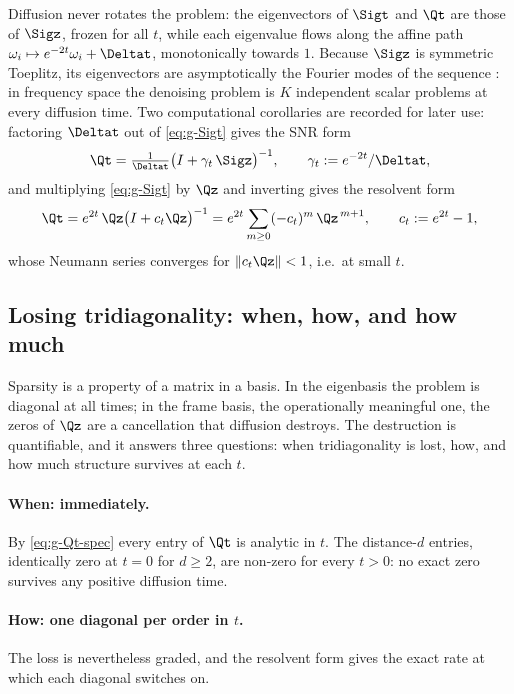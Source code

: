 Diffusion never rotates the problem: the eigenvectors of $\Sigt$ and
$\Qt$ are those of $\Sigz$, frozen for all $t$, while each eigenvalue
flows along the affine path $\omega_i \mapsto e^{-2t}\omega_i + \Deltat$,
monotonically towards $1$. Because $\Sigz$ is symmetric Toeplitz, its
eigenvectors are asymptotically the Fourier modes of the sequence
\citep{brockwell1991time}: in frequency space the denoising problem is $K$
independent scalar problems at every diffusion time. Two computational
corollaries are recorded for later use: factoring $\Deltat$ out of
\eqref{eq:g-Sigt} gives the SNR form
\begin{equation}
  \Qt = \tfrac{1}{\Deltat} \big( I + \gamma_t\, \Sigz \big)^{-1},
  \qquad \gamma_t := e^{-2t}/\Deltat ,
  \label{eq:g-Qt-snr}
\end{equation}
and multiplying \eqref{eq:g-Sigt} by $\Qz$ and inverting gives the
resolvent form
\begin{equation}
  \Qt = e^{2t}\, \Qz \big( I + c_t \Qz \big)^{-1}
      = e^{2t} \sum_{m \geq 0} (-c_t)^m\, \Qz^{\,m+1},
  \qquad c_t := e^{2t} - 1 ,
  \label{eq:g-Qt-res}
\end{equation}
whose Neumann series converges for $\|c_t \Qz\| < 1$, i.e.\ at small $t$.

\subsection{Losing tridiagonality: when, how, and how much}
\label{sec:g-tridiag-loss}

Sparsity is a property of a matrix in a basis. In the eigenbasis the
problem is diagonal at all times; in the frame basis, the operationally
meaningful one, the zeros of $\Qz$ are a cancellation that diffusion
destroys. The destruction is quantifiable, and it answers three questions:
when tridiagonality is lost, how, and how much structure survives at
each $t$.

\paragraph{When: immediately.} By \eqref{eq:g-Qt-spec} every entry of
$\Qt$ is analytic in $t$. The distance-$d$ entries, identically zero at
$t = 0$ for $d \geq 2$, are non-zero for every $t > 0$: no exact zero
survives any positive diffusion time.

\paragraph{How: one diagonal per order in $t$.} The loss is nevertheless
graded, and the resolvent form gives the exact rate at which each diagonal
switches on.

